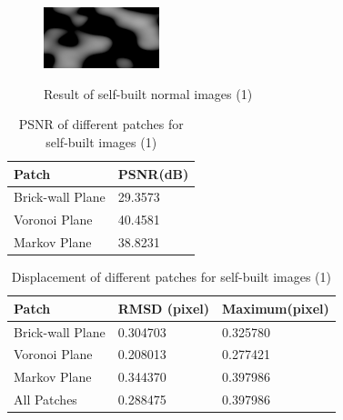 \begin{figure}[htbp]
{		\includegraphics[width=0.30\textwidth]{images/Evaluation/Normal_case1/patch_3_ROI_of_warped_image}
	} \hspace{-2mm}
	\hspace{-2.5mm}
\\
	\caption{Result of self-built normal images (1)}
	\label{fig:Result of Self-built Normal Images(1)}
\end{figure}

\begin{table}[tbp]
	\centering
	\scriptsize  
	\begin{tabular}{p{80pt} p{60pt}}
		\toprule
		Patch & {\bfseries PSNR(dB)}\\ \midrule
		Brick-wall Plane&  29.3573\\
		\addlinespace[3pt]
		Voronoi Plane  &  40.4581\\
		\addlinespace[3pt]
		Markov Plane &38.8231 \\ \bottomrule
	\end{tabular}
	\caption{PSNR of different patches for self-built images (1)}  
	\label{tab:PSNR of different patches for Self-built Images(1)} 
\end{table}

\begin{table}[htbp]
	\centering
	\scriptsize 
	\begin{tabular}{p{80pt} p{60pt} p{60pt}}
		\toprule
		Patch & {\bfseries RMSD (pixel)} & {\bfseries Maximum(pixel)}\\ \midrule
		Brick-wall Plane&  0.304703&0.325780 \\
		\addlinespace[3pt]
		Voronoi Plane  &  0.208013&0.277421 \\
		\addlinespace[3pt]
		Markov Plane & 0.344370&0.397986 \\ 
		\addlinespace[3pt]
		All Patches & 0.288475&0.397986 \\ \bottomrule
	\end{tabular}
	\caption{Displacement of different patches for self-built images (1)}  
	\label{tab:Displacement of different patches for self-built images (1)} 
\end{table}

